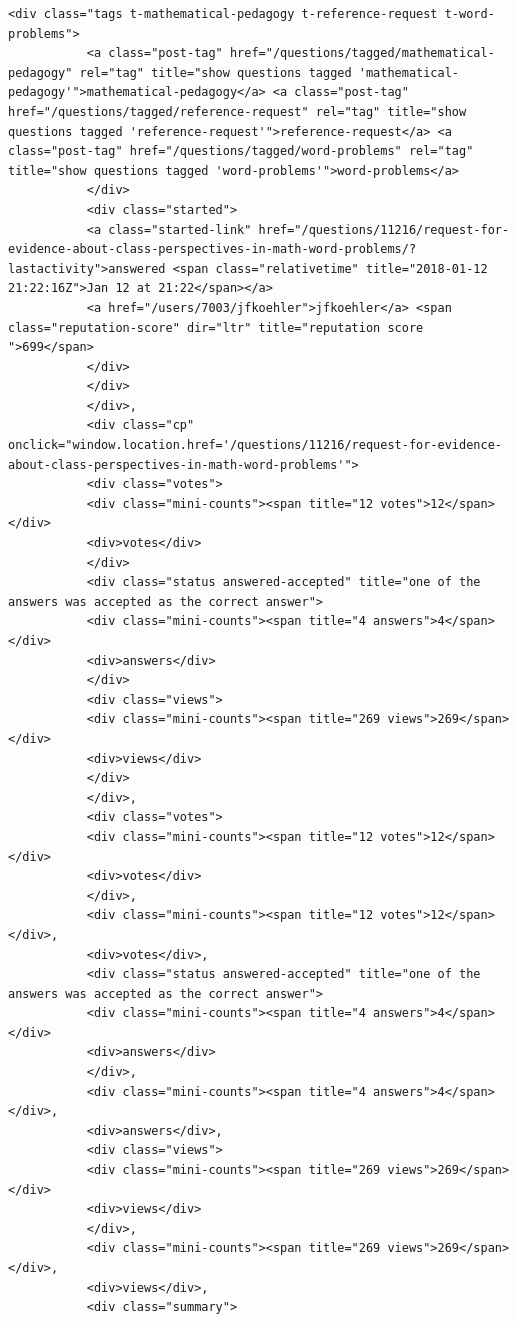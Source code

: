 \documentclass[11pt]{article}
\begin{document}
\begin{Verbatim}[commandchars=\\\{\}]
           <div class="tags t-mathematical-pedagogy t-reference-request t-word-problems">
           <a class="post-tag" href="/questions/tagged/mathematical-pedagogy" rel="tag" title="show questions tagged 'mathematical-pedagogy'">mathematical-pedagogy</a> <a class="post-tag" href="/questions/tagged/reference-request" rel="tag" title="show questions tagged 'reference-request'">reference-request</a> <a class="post-tag" href="/questions/tagged/word-problems" rel="tag" title="show questions tagged 'word-problems'">word-problems</a>
           </div>
           <div class="started">
           <a class="started-link" href="/questions/11216/request-for-evidence-about-class-perspectives-in-math-word-problems/?lastactivity">answered <span class="relativetime" title="2018-01-12 21:22:16Z">Jan 12 at 21:22</span></a>
           <a href="/users/7003/jfkoehler">jfkoehler</a> <span class="reputation-score" dir="ltr" title="reputation score ">699</span>
           </div>
           </div>
           </div>,
           <div class="cp" onclick="window.location.href='/questions/11216/request-for-evidence-about-class-perspectives-in-math-word-problems'">
           <div class="votes">
           <div class="mini-counts"><span title="12 votes">12</span></div>
           <div>votes</div>
           </div>
           <div class="status answered-accepted" title="one of the answers was accepted as the correct answer">
           <div class="mini-counts"><span title="4 answers">4</span></div>
           <div>answers</div>
           </div>
           <div class="views">
           <div class="mini-counts"><span title="269 views">269</span></div>
           <div>views</div>
           </div>
           </div>,
           <div class="votes">
           <div class="mini-counts"><span title="12 votes">12</span></div>
           <div>votes</div>
           </div>,
           <div class="mini-counts"><span title="12 votes">12</span></div>,
           <div>votes</div>,
           <div class="status answered-accepted" title="one of the answers was accepted as the correct answer">
           <div class="mini-counts"><span title="4 answers">4</span></div>
           <div>answers</div>
           </div>,
           <div class="mini-counts"><span title="4 answers">4</span></div>,
           <div>answers</div>,
           <div class="views">
           <div class="mini-counts"><span title="269 views">269</span></div>
           <div>views</div>
           </div>,
           <div class="mini-counts"><span title="269 views">269</span></div>,
           <div>views</div>,
           <div class="summary">

\end{Verbatim}
\end{document}
